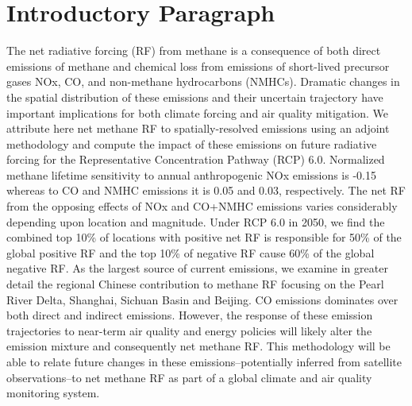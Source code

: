 \section*{Introductory Paragraph}

The net radiative forcing (RF) from methane is a consequence of both direct emissions of methane and chemical loss from emissions of short-lived precursor gases NOx, CO, and non-methane hydrocarbons (NMHCs). Dramatic changes in the spatial distribution of these emissions and their uncertain trajectory have important implications for both climate forcing and air quality mitigation.  We attribute here net methane RF  to spatially-resolved emissions using an adjoint methodology and compute the impact of these emissions on future radiative forcing for the Representative Concentration Pathway (RCP) 6.0.  Normalized methane lifetime sensitivity  to annual anthropogenic NOx emissions is -0.15 whereas to CO and NMHC emissions it is 0.05 and 0.03, respectively. The net RF from the opposing effects of NOx and CO+NMHC emissions varies considerably depending upon location and magnitude.  Under RCP 6.0 in 2050,  we find the combined top 10\% of locations with positive net RF is responsible for 50\% of the global positive RF and the top 10\% of negative RF  cause 60\% of the global negative RF. As the largest source of current emissions, we examine in greater detail the regional Chinese contribution to methane RF focusing on the Pearl River Delta, Shanghai, Sichuan Basin and Beijing.  CO emissions dominates over both direct and indirect emissions. However, the response of these emission trajectories to near-term air quality and energy policies will likely alter the emission mixture and consequently net methane RF. This methodology will be able to relate future changes in these emissions--potentially inferred from satellite observations--to net methane RF  as part of a global climate and air quality monitoring system. 